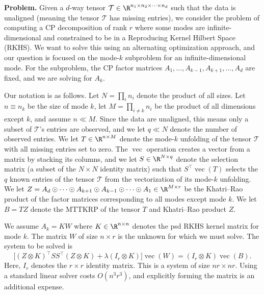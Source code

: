 
\textbf{Problem.}
Given a $d$-way tensor $\mathcal{T} \in \R^{n_1 \times n_2 \times \cdots \times n_d}$ such that the data
is unaligned (meaning the tensor $\mathcal{T}$ has missing entries), we consider the problem of computing
a CP decomposition of rank $r$ where some modes are infinite-dimensional and constrained to be in a
Reproducing Kernel Hilbert Space (RKHS). We want to solve this using an alternating optimization approach,
and our question is focused on the mode-$k$ subproblem for an infinite-dimensional mode. For the subproblem,
the CP factor matrices $A_1, \ldots, A_{k-1}, A_{k+1}, \ldots, A_d$ are fixed, and we are solving for $A_k$.

Our notation is as follows. Let $N = \prod_i n_i$ denote the product of all sizes. Let $n \equiv n_k$ be
the size of mode $k$, let $M = \prod_{i \neq k} n_i$ be the product of all dimensions except $k$, and
assume $n \ll M$. Since the data are unaligned, this means only a subset of $\mathcal{T}$'s entries are
observed, and we let $q \ll N$ denote the number of observed entries. We let $T \in \R^{n \times M}$
denote the mode-$k$ unfolding of the tensor $\mathcal{T}$ with all missing entries set to zero. The
$\operatorname{vec}$ operation creates a vector from a matrix by stacking its columns, and we let
$S \in \R^{N \times q}$ denote the selection matrix (a subset of the $N \times N$ identity matrix) such
that $S^\top \operatorname{vec}(T)$ selects the $q$ known entries of the tensor $\mathcal{T}$ from the
vectorization of its mode-$k$ unfolding. We let
$Z = A_d \odot \cdots \odot A_{k+1} \odot A_{k-1} \odot \cdots \odot A_1 \in \R^{M \times r}$
be the Khatri--Rao product of the factor matrices corresponding to all modes except mode $k$.
We let $B = T Z$ denote the MTTKRP of the tensor $T$ and Khatri--Rao product $Z$.

We assume $A_k = KW$ where $K \in \R^{n \times n}$ denotes the psd RKHS kernel matrix for mode $k$.
The matrix $W$ of size $n \times r$ is the unknown for which we must solve. The system to be solved is
\begin{equation}\label{eq:p10-system}
  \bigl[(Z \otimes K)^\top S S^\top (Z \otimes K) + \lambda (I_r \otimes K)\bigr] \operatorname{vec}(W)
  = (I_r \otimes K) \operatorname{vec}(B).
\end{equation}
Here, $I_r$ denotes the $r \times r$ identity matrix. This is a system of size $nr \times nr$. Using
a standard linear solver costs $O(n^3 r^3)$, and explicitly forming the matrix is an additional expense.

